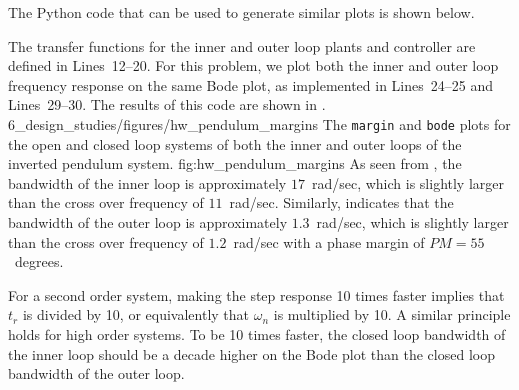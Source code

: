 
The Python code that can be used to generate similar plots is shown below.


The transfer functions for the inner and outer loop plants and controller are defined in Lines~12--20.  For this problem, we plot both the inner and outer loop frequency response on the same Bode plot, as implemented in Lines~24--25 and Lines~29--30. The results of this code are shown in .
	{6_design_studies/figures/hw_pendulum_margins}
	{The {\tt margin} and {\tt bode} plots for the open and closed loop systems of both the inner and outer loops of the inverted pendulum system.}
	{fig:hw_pendulum_margins}
As seen from , the bandwidth of the inner loop is approximately $17$~rad/sec, which is slightly larger than the cross over frequency of $11$~rad/sec.  
%
Similarly,  indicates that the bandwidth of the outer loop is approximately $1.3$~rad/sec, which is slightly larger than the cross over frequency of $1.2$~rad/sec with a phase margin of $PM=55$~degrees.

For a second order system, making the step response 10 times faster implies that $t_r$ is divided by 10, or equivalently that $\omega_n$ is multiplied by 10.  A similar principle holds for high order systems.  To be 10 times faster, the closed loop bandwidth of the inner loop should be a decade higher on the Bode plot than the closed loop bandwidth of the outer loop.

